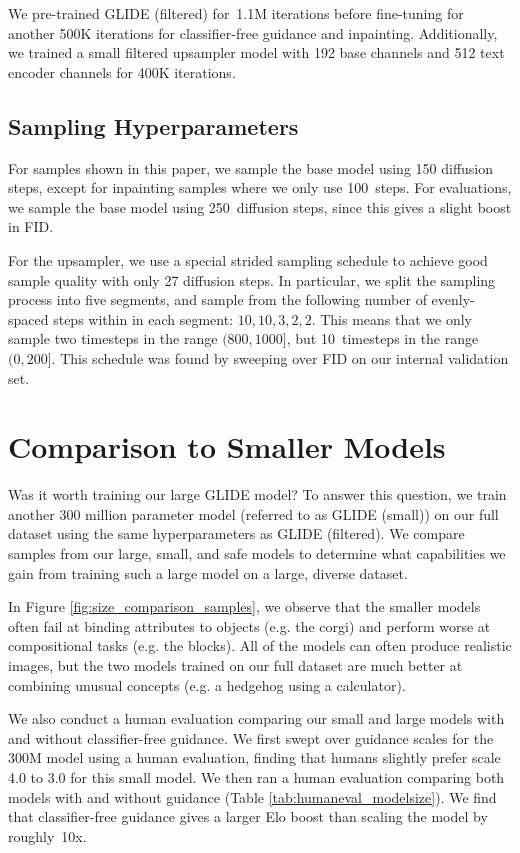 \documentclass{article}
\newcommand{\modelname}{GLIDE}
\begin{document}
We pre-trained \modelname{} (filtered) for~1.1M iterations before fine-tuning for another 500K iterations for classifier-free guidance and inpainting. Additionally, we trained a small filtered upsampler model with 192 base channels and 512 text encoder channels for 400K iterations.

\subsection{Sampling Hyperparameters}

For samples shown in this paper, we sample the base model using 150 diffusion steps, except for inpainting samples where we only use 100~steps. For evaluations, we sample the base model using 250~diffusion steps, since this gives a slight boost in FID.

For the upsampler, we use a special strided sampling schedule to achieve good sample quality with only 27 diffusion steps. In particular, we split the sampling process into five segments, and sample from the following number of evenly-spaced steps within in each segment: $10,10,3,2,2$. This means that we only sample two timesteps in the range $(800, 1000]$, but 10~timesteps in the range $(0,200]$. This schedule was found by sweeping over FID on our internal validation set.

\section{Comparison to Smaller Models}
\label{app:comp_small}

Was it worth training our large \modelname{} model? To answer this question, we train another 300 million parameter model (referred to as \modelname{} (small)) on our full dataset using the same hyperparameters as \modelname{} (filtered). We compare samples from our large, small, and safe models to determine what capabilities we gain from training such a large model on a large, diverse dataset.

In Figure \ref{fig:size_comparison_samples}, we observe that the smaller models often fail at binding attributes to objects (e.g. the corgi) and perform worse at compositional tasks (e.g. the blocks). All of the models can often produce realistic images, but the two models trained on our full dataset are much better at combining unusual concepts (e.g. a hedgehog using a calculator).

We also conduct a human evaluation comparing our small and large models with and without classifier-free guidance. We first swept over guidance scales for the 300M model using a human evaluation, finding that humans slightly prefer scale 4.0 to 3.0 for this small model. We then ran a human evaluation comparing both models with and without guidance (Table \ref{tab:humaneval_modelsize}). We find that classifier-free guidance gives a larger Elo boost than scaling the model by roughly~10x.
\end{document}
